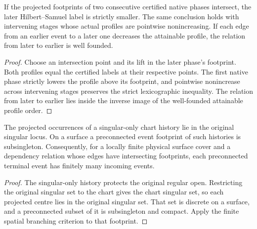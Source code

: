 \begin{theorem}
\label{hir:g8-intersecting-phase-labels}
\leanok
If the projected footprints of two consecutive certified native
phases intersect, the later Hilbert--Samuel label is strictly smaller.
The same conclusion holds with intervening stages whose actual
profiles are pointwise nonincreasing. If each edge from an earlier
event to a later one decreases the attainable profile, the relation
from later to earlier is well founded.
\end{theorem}
\begin{proof}
Choose an intersection point and its lift in the later phase's
footprint. Both profiles equal the certified labels at their
respective points. The first native phase strictly lowers the
profile above its footprint, and pointwise nonincrease across
intervening stages preserves the strict lexicographic inequality.
The relation from later to earlier lies inside the inverse image
of the well-founded attainable profile order.
\end{proof}

\begin{theorem}
\label{hir:g8-connected-surface-events}
\leanok
The projected occurrences of a singular-only chart history lie in
the original singular locus. On a surface a preconnected event
footprint of such histories is subsingleton. Consequently,
for a locally finite physical surface cover and a dependency
relation whose edges have intersecting footprints, each
preconnected terminal event has finitely many incoming events.
\end{theorem}
\begin{proof}
The singular-only history protects the original regular open.
Restricting the original singular set to the chart gives the chart
singular set, so each projected centre lies in the original
singular set. That set is discrete on a surface, and a preconnected
subset of it is subsingleton and compact. Apply the finite
spatial branching criterion to that footprint.
\end{proof}

